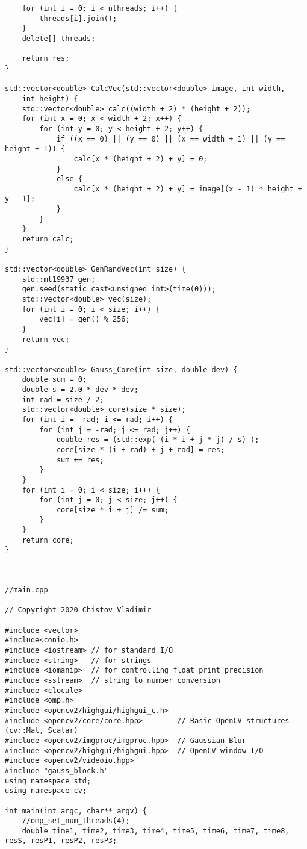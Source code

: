 \documentclass{report}
\begin{document}
\begin{lstlisting}
    for (int i = 0; i < nthreads; i++) {
        threads[i].join();
    }
    delete[] threads;

    return res;
}

std::vector<double> CalcVec(std::vector<double> image, int width,
    int height) {
    std::vector<double> calc((width + 2) * (height + 2));
    for (int x = 0; x < width + 2; x++) {
        for (int y = 0; y < height + 2; y++) {
            if ((x == 0) || (y == 0) || (x == width + 1) || (y == height + 1)) {
                calc[x * (height + 2) + y] = 0;
            }
            else {
                calc[x * (height + 2) + y] = image[(x - 1) * height + y - 1];
            }
        }
    }
    return calc;
}

std::vector<double> GenRandVec(int size) {
    std::mt19937 gen;
    gen.seed(static_cast<unsigned int>(time(0)));
    std::vector<double> vec(size);
    for (int i = 0; i < size; i++) {
        vec[i] = gen() % 256;
    }
    return vec;
}

std::vector<double> Gauss_Core(int size, double dev) {
    double sum = 0;
    double s = 2.0 * dev * dev;
    int rad = size / 2;
    std::vector<double> core(size * size);
    for (int i = -rad; i <= rad; i++) {
        for (int j = -rad; j <= rad; j++) {
            double res = (std::exp(-(i * i + j * j) / s) );
            core[size * (i + rad) + j + rad] = res;
            sum += res;
        }
    }
    for (int i = 0; i < size; i++) {
        for (int j = 0; j < size; j++) {
            core[size * i + j] /= sum;
        }
    }
    return core;
}



//main.cpp

// Copyright 2020 Chistov Vladimir

#include <vector>
#include<conio.h>
#include <iostream> // for standard I/O
#include <string>   // for strings
#include <iomanip>  // for controlling float print precision
#include <sstream>  // string to number conversion
#include <clocale>
#include <omp.h>
#include <opencv2/highgui/highgui_c.h>
#include <opencv2/core/core.hpp>        // Basic OpenCV structures (cv::Mat, Scalar)
#include <opencv2/imgproc/imgproc.hpp>  // Gaussian Blur
#include <opencv2/highgui/highgui.hpp>  // OpenCV window I/O
#include <opencv2/videoio.hpp>
#include "gauss_block.h"
using namespace std;
using namespace cv;

int main(int argc, char** argv) {
	//omp_set_num_threads(4);
	double time1, time2, time3, time4, time5, time6, time7, time8, resS, resP1, resP2, resP3;


\end{lstlisting}
\end{document}
